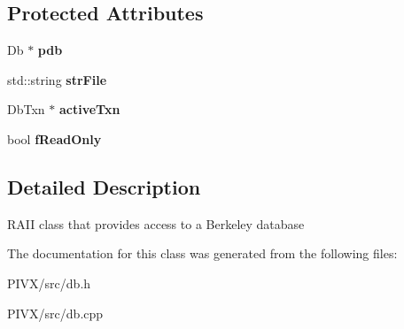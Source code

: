 \subsection*{Protected Attributes}
\begin{DoxyCompactItemize}
\item 
\mbox{\label{class_c_d_b_a4520f55d31246fc06d80f72b5dd62253}} 
Db $\ast$ {\bfseries pdb}
\item 
\mbox{\label{class_c_d_b_a15c6112d9db9dcc5f11a2c05d9aa74a5}} 
std\+::string {\bfseries str\+File}
\item 
\mbox{\label{class_c_d_b_ac06d74a2d113f593869d2f93188a0adc}} 
Db\+Txn $\ast$ {\bfseries active\+Txn}
\item 
\mbox{\label{class_c_d_b_a92ca6c13982a03afdb846588a61608fc}} 
bool {\bfseries f\+Read\+Only}
\end{DoxyCompactItemize}


\subsection{Detailed Description}
R\+A\+II class that provides access to a Berkeley database 

The documentation for this class was generated from the following files\+:\begin{DoxyCompactItemize}
\item 
P\+I\+V\+X/src/db.\+h\item 
P\+I\+V\+X/src/db.\+cpp\end{DoxyCompactItemize}
